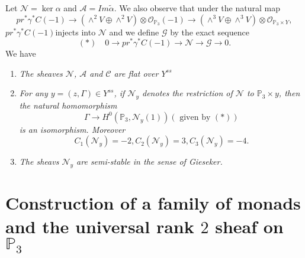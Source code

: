 Let $\mathscr{N}=\ker \alpha$ and $\mathscr{A}=Im\widetilde{\alpha}$. We also observe that under the natural map 
$$
pr^{\ast}\gamma^{\ast}C(-1)\to \left(\displaystyle\mathop{\wedge}^{2}V\oplus \displaystyle\mathop{\wedge}^{2}V\right) \otimes \mathscr{O}_{\mathbb{P}_3}(-1)\to \left(\displaystyle\mathop{\wedge}^{3}V\oplus \displaystyle\mathop{\wedge}^{3}V\right)\otimes \mathscr{O}_{\mathbb{P}_3\times Y}, 
$$
$pr^{\ast}\gamma^{\ast}C(-1)$\pageoriginale injects into $\mathscr{N}$ and we define $\mathscr{G}$ by the exact sequence 
$$
(\ast)\quad 0\to pr^{\ast}\gamma^{\ast}C(-1)\to \mathscr{N}\to \mathscr{G}\to 0. 
$$
We have 

\begin{Prop}
\begin{enumerate}
\renewcommand{\labelenumi}{(\theenumi)}
\item \textit{The sheaves $\mathscr{N}$, $\mathscr{A}$ and $\mathscr{C}$ are flat over $Y^{ss}$}
\item \textit{For any $y=(z,\Gamma)\in Y^{ss}$, if $\mathscr{N}_y$ denotes the restriction of $\mathscr{N}$ to $\mathbb{P}_3\times y$, then the natural homomorphism}
$$
\Gamma \to H^{0}(\mathbb{P}_3,\mathscr{N}_y(1))(\text{ given by } (\ast))
$$
\textit{is an isomorphism. Moreover}
$$
C_1(\mathscr{N}_y)=-2,C_2(\mathscr{N}_y)=3,C_3(\mathscr{N}_y)=-4.
$$
\item \textit{The sheavs $\mathscr{N}_y$ are semi-stable in the sense of Gieseker.}
\end{enumerate}
\end{Prop}

\section[Construction of a family of monads...]{Construction of a family of monads and the universal rank \texorpdfstring{$2$}{eq} sheaf on \texorpdfstring{$\mathbb{P}_3$}{eq}}\label{s7}

